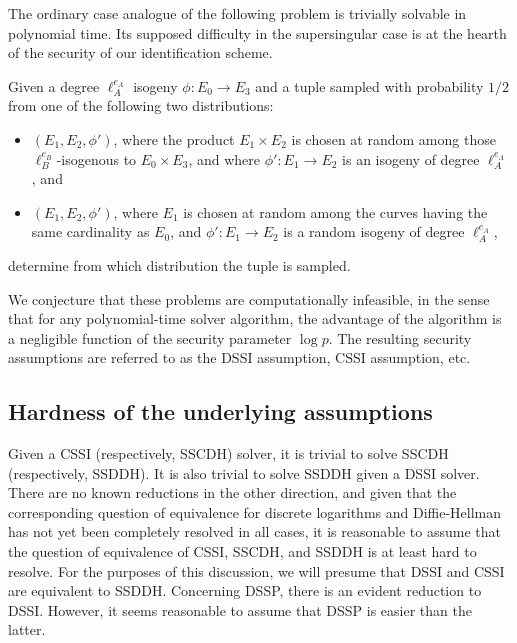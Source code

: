 \documentclass[jmc]{degruyter-journal-a}
\theoremstyle{definition}
\begin{document}
The ordinary case analogue of the following problem is trivially
solvable in polynomial time. Its supposed difficulty in the
supersingular case is at the hearth of the security of our
identification scheme.

\begin{problem}
  Given a degree $\ell_A^{e_A}$ isogeny $\phi:E_0\to E_3$ and a
  tuple sampled with probability $1/2$ from one of the following two
  distributions:
  \begin{itemize} 
  \item $(E_1,E_2,\phi')$, where the product $E_1\times E_2$ is chosen
    at random among those $\ell_B^{e_B}$-isogenous to $E_0\times E_3$,
    and where $\phi':E_1\to E_2$ is an isogeny of degree
    $\ell_A^{e_A}$, and
  \item $(E_1,E_2,\phi')$, where $E_1$ is chosen at random among the
    curves having the same cardinality as $E_0$, and $\phi':E_1\to
    E_2$ is a random isogeny of degree $\ell_A^{e_A}$,
  \end{itemize}
  determine from which distribution the tuple is sampled.
\end{problem}

We conjecture that these problems are computationally infeasible, in
the sense that for any polynomial-time solver algorithm, the advantage
of the algorithm is a negligible function of the security parameter
$\log p$. The resulting security assumptions are referred to as the
DSSI assumption, CSSI assumption, etc.


\subsection{Hardness of the underlying
  assumptions}\label{subsec:hardness}

Given a CSSI (respectively, SSCDH) solver, it is trivial to solve
SSCDH (respectively, SSDDH). It is also trivial to solve SSDDH given a
DSSI solver. There are no known reductions in the other direction, and
given that the corresponding question of equivalence for discrete
logarithms and Diffie-Hellman has not yet been completely resolved in
all cases, it is reasonable to assume that the question of equivalence
of CSSI, SSCDH, and SSDDH is at least hard to resolve. For the
purposes of this discussion, we will presume that DSSI and CSSI are
equivalent to SSDDH. Concerning DSSP, there is an evident reduction to
DSSI. However, it seems reasonable to assume that DSSP is easier than the
latter.
\end{document}
